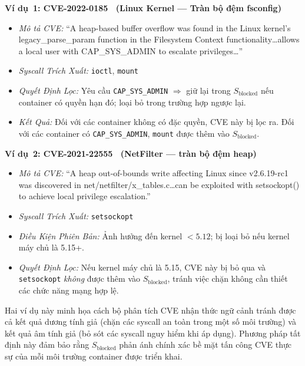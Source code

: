 \textbf{Ví dụ~1: CVE-2022-0185~\cite{cve_2022_0185} (Linux Kernel --- Tràn bộ đệm fsconfig)}
\begin{itemize}
  \item \textit{Mô tả CVE:} ``A heap-based buffer overflow was found in the Linux kernel's
        legacy\_parse\_param function in the Filesystem Context functionality\ldots allows a
        local user with CAP\_SYS\_ADMIN to escalate privileges\ldots''
  \item \textit{Syscall Trích Xuất:} \texttt{ioctl}, \texttt{mount}
  \item \textit{Quyết Định Lọc:} Yêu cầu \texttt{CAP\_SYS\_ADMIN} $\Rightarrow$ giữ lại trong
        $S_{\text{blocked}}$ nếu container có quyền hạn đó; loại bỏ trong trường hợp ngược lại.
  \item \textit{Kết Quả:} Đối với các container không có đặc quyền, CVE này bị lọc ra. Đối với các container
        có \texttt{CAP\_SYS\_ADMIN}, \texttt{mount} được thêm vào $S_{\text{blocked}}$.
\end{itemize}

\textbf{Ví dụ~2: CVE-2021-22555~\cite{cve_2021_22555} (NetFilter --- tràn bộ đệm heap)}
\begin{itemize}
  \item \textit{Mô tả CVE:} ``A heap out-of-bounds write affecting Linux since
        v2.6.19-rc1 was discovered in net/netfilter/x\_tables.c\ldots can be exploited with
        setsockopt() to achieve local privilege escalation.''
  \item \textit{Syscall Trích Xuất:} \texttt{setsockopt}
  \item \textit{Điều Kiện Phiên Bản:} Ảnh hưởng đến kernel $< 5.12$; bị loại bỏ nếu kernel máy chủ là
        5.15+.
  \item \textit{Quyết Định Lọc:} Nếu kernel máy chủ là 5.15, CVE này bị bỏ qua và
        \texttt{setsockopt} \textit{không} được thêm vào $S_{\text{blocked}}$, tránh việc chặn không cần thiết
        các chức năng mạng hợp lệ.
\end{itemize}

Hai ví dụ này minh họa cách bộ phân tích CVE nhận thức ngữ cảnh tránh được cả kết quả dương tính giả
(chặn các syscall an toàn trong một số môi trường) và kết quả âm tính giả (bỏ sót các syscall nguy hiểm
khi áp dụng). Phương pháp tất định này đảm bảo rằng $S_{\text{blocked}}$ phản ánh chính xác
bề mặt tấn công CVE thực sự của mỗi môi trường container được triển khai.
